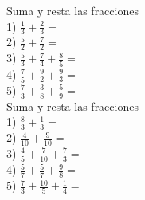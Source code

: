 \documentclass[a4paper,12pt]{article}
\begin{document}
 \pagebreak 
 Suma  y resta las fracciones\vspace{1cm}\\ 
1) $\frac{1}{3}+\frac{2}{3}=$\vspace{1cm}\\ 
2) $\frac{5}{2}+\frac{7}{2}=$\vspace{1cm}\\ 
3) $\frac{5}{3}+\frac{7}{4}+\frac{8}{5}  =$\vspace{1cm}\\ 
4) $\frac{7}{5}+\frac{9}{2}+\frac{9}{3}  =$\vspace{1cm}\\ 
5) $\frac{7}{3}+\frac{3}{8}+\frac{5}{9}  =$\vspace{1cm}\\ 

 \pagebreak 
 Suma  y resta las fracciones\vspace{1cm}\\ 
1) $\frac{8}{3}+\frac{1}{3}=$\vspace{1cm}\\ 
2) $\frac{4}{10}+\frac{9}{10}=$\vspace{1cm}\\ 
3) $\frac{4}{5}+\frac{7}{10}+\frac{7}{3}  =$\vspace{1cm}\\ 
4) $\frac{5}{7}+\frac{5}{7}+\frac{9}{8}  =$\vspace{1cm}\\ 
5) $\frac{7}{3}+\frac{10}{5}+\frac{1}{4}  =$\vspace{1cm}\\ 

 \pagebreak 
\end{document}
